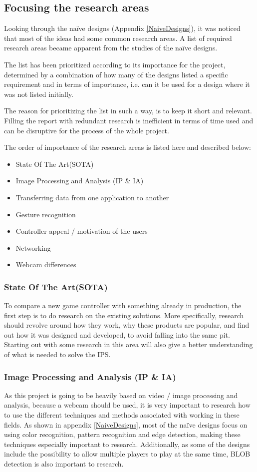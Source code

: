 \subsection{Focusing the research areas}
Looking through the naïve designs (Appendix \ref{NaiveDesigns}), it was noticed that most of the ideas had some common research areas. A list of required research areas became apparent from the studies of the naïve designs.

The list has been prioritized according to its importance for the project, determined by a combination of how many of the designs listed a specific requirement and in terms of importance, i.e. can it be used for a design where it was not listed initially.

The reason for prioritizing the list in such a way, is to keep it short and relevant. Filling the report with redundant research is inefficient in terms of time used and can be disruptive for the process of the whole project.
\bigskip

The order of importance of the research areas is listed here and described below:
\begin{itemize}
\item State Of The Art(SOTA)
\item Image Processing and Analysis (IP \& IA)
\item Transferring data from one application to another
\item Gesture recognition
\item Controller appeal / motivation of the users
\item Networking
\item Webcam differences
\end{itemize}

\subsubsection{State Of The Art(SOTA)}
To compare a new game controller with something already in production, the first step is to do research on the existing solutions. More specifically, research should revolve around how they work, why these products are popular, and find out how it was designed and developed, to avoid falling into the same pit. Starting out with some research in this area will also give a better understanding of what is needed to solve the IPS.

\subsubsection{Image Processing and Analysis (IP \& IA)}
As this project is going to be heavily based on video / image processing and analysis, because a webcam should be used, it is very important to research how to use the different techniques and methods associated with working in these fields. As shown in appendix \ref{NaiveDesigns}, most of the naïve designs focus on using color recognition, pattern recognition and edge detection, making these techniques especially important to research. Additionally, as some of the designs include the possibility to allow multiple players to play at the same time, BLOB detection is also important to research.

